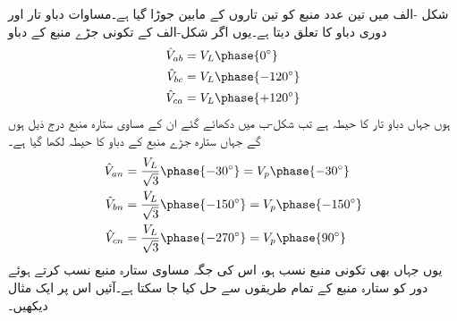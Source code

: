 شکل -الف میں تین عدد منبع کو تین تاروں کے مابین  جوڑا گیا ہے۔مساوات  دباو تار اور دوری دباو کا تعلق دیتا ہے۔یوں اگر شکل-الف کے تکونی جڑے منبع کے دباو
\begin{gather}
\begin{aligned}
\hat{V}_{ab}&=V_L\phase{0^{\circ}}\\
\hat{V}_{bc}&=V_L\phase{-120^{\circ}}\\
\hat{V}_{ca}&=V_L\phase{+120^{\circ}}
\end{aligned}
\end{gather}
ہوں جہاں  دباو تار کا حیطہ  ہے تب شکل-ب میں دکھائے گئے ان کے مساوی ستارہ منبع درج ذیل ہوں گے جہاں ستارہ جڑے منبع کے دباو کا حیطہ  لکھا گیا ہے۔
 \begin{gather}
\begin{aligned}
\hat{V}_{an}&=\frac{V_L}{\sqrt{3}}\phase{-30^{\circ}}=V_p\phase{-30^{\circ}}\\
\hat{V}_{bn}&=\frac{V_L}{\sqrt{3}}\phase{-150^{\circ}}=V_p\phase{-150^{\circ}}\\
\hat{V}_{cn}&=\frac{V_L}{\sqrt{3}}\phase{-270^{\circ}}=V_p\phase{90^{\circ}}
\end{aligned}
\end{gather}
یوں جہاں بھی تکونی منبع نسب ہو، اس کی جگہ مساوی ستارہ منبع نسب کرتے ہوئے دور کو ستارہ منبع کے تمام طریقوں سے حل کیا جا سکتا ہے۔آئیں اس پر ایک مثال دیکھیں۔ 
